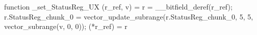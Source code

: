 function _set_StatusReg_UX (r_ref, v) = {
    r = __bitfield_deref(r_ref);
    r.StatusReg_chunk_0 = vector_update_subrange(r.StatusReg_chunk_0, 5, 5, vector_subrange(v, 0, 0));
    (*r_ref) = r
}
